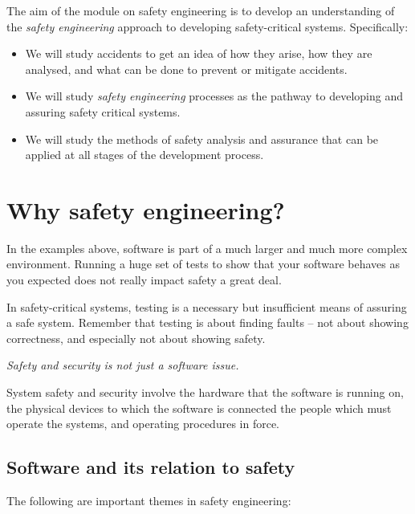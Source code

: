 The aim of the module on safety engineering is to develop an understanding of the \emph{safety engineering} approach to developing safety-critical systems. Specifically:

\begin{itemize}

  \item We will study accidents to get an idea of how they arise, how
    they are analysed, and what can be done to prevent or mitigate
    accidents.

  \item We will study \emph{safety engineering} processes as the
    pathway to developing and assuring safety critical systems.

  \item We will study the methods of safety analysis and assurance that
    can be applied at all stages of the development process.

\end{itemize}


\section{Why safety engineering?}
\label{sec:safety:safety-engineering}

In the examples above, software is part of a much larger and much
  more complex environment. Running a huge set of tests to show that your software behaves as you expected does not really impact safety a great deal.


In safety-critical systems, testing is a necessary but insufficient means of assuring a safe system.  Remember that testing is about finding faults -- not about showing correctness, and especially not about showing safety.

\emph{Safety and security is not just a software issue.}

  System safety and security involve the hardware that the software is
  running on, the physical devices to which the software is connected
  the people which must operate the systems, and operating procedures
  in force.

\subsection*{Software and its relation to safety}

The following are important themes in safety engineering:

